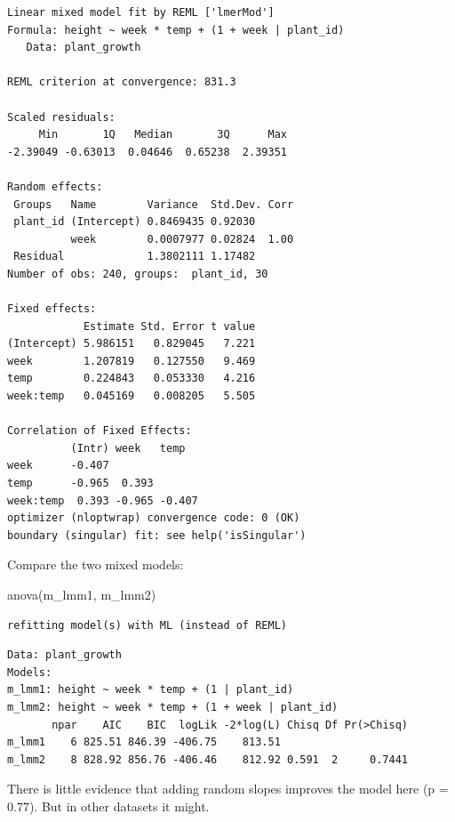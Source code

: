 \documentclass[
  letterpaper,
  8pt,
  a4paper]{book}
\newenvironment{Shaded}{\begin{snugshade}}{\end{snugshade}}
\newcommand{\FunctionTok}[1]{\textcolor[rgb]{0.28,0.35,0.67}{#1}}
\newcommand{\NormalTok}[1]{\textcolor[rgb]{0.00,0.23,0.31}{#1}}
\begin{document}
\begin{verbatim}
Linear mixed model fit by REML ['lmerMod']
Formula: height ~ week * temp + (1 + week | plant_id)
   Data: plant_growth

REML criterion at convergence: 831.3

Scaled residuals: 
     Min       1Q   Median       3Q      Max 
-2.39049 -0.63013  0.04646  0.65238  2.39351 

Random effects:
 Groups   Name        Variance  Std.Dev. Corr 
 plant_id (Intercept) 0.8469435 0.92030       
          week        0.0007977 0.02824  1.00 
 Residual             1.3802111 1.17482       
Number of obs: 240, groups:  plant_id, 30

Fixed effects:
            Estimate Std. Error t value
(Intercept) 5.986151   0.829045   7.221
week        1.207819   0.127550   9.469
temp        0.224843   0.053330   4.216
week:temp   0.045169   0.008205   5.505

Correlation of Fixed Effects:
          (Intr) week   temp  
week      -0.407              
temp      -0.965  0.393       
week:temp  0.393 -0.965 -0.407
optimizer (nloptwrap) convergence code: 0 (OK)
boundary (singular) fit: see help('isSingular')
\end{verbatim}

Compare the two mixed models:

\begin{Shaded}
\begin{Highlighting}[]
\FunctionTok{anova}\NormalTok{(m\_lmm1, m\_lmm2)}
\end{Highlighting}
\end{Shaded}

\begin{verbatim}
refitting model(s) with ML (instead of REML)
\end{verbatim}

\begin{verbatim}
Data: plant_growth
Models:
m_lmm1: height ~ week * temp + (1 | plant_id)
m_lmm2: height ~ week * temp + (1 + week | plant_id)
       npar    AIC    BIC  logLik -2*log(L) Chisq Df Pr(>Chisq)
m_lmm1    6 825.51 846.39 -406.75    813.51                    
m_lmm2    8 828.92 856.76 -406.46    812.92 0.591  2     0.7441
\end{verbatim}

There is little evidence that adding random slopes improves the model
here (p = 0.77). But in other datasets it might.
\end{document}
